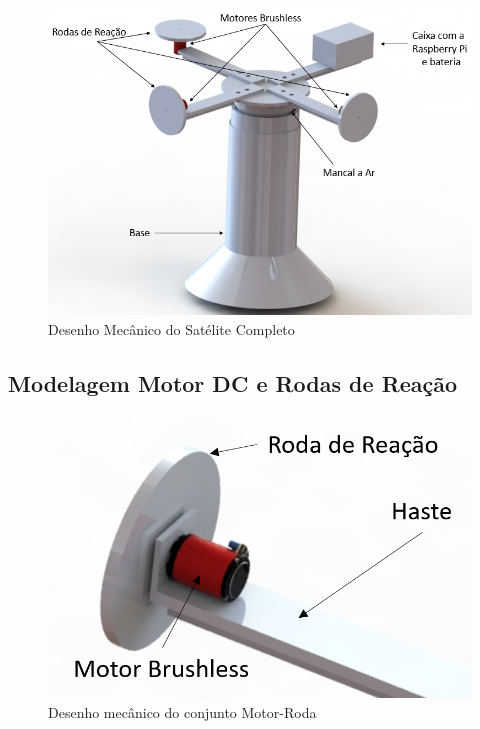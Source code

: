 \begin{figure}[H]
  \caption{Desenho Mecânico do Satélite Completo}
  \begin{center}
      \includegraphics[scale=.75]{img/satelite_completo}
  \end{center}
  \label{fig:satelite_completo}
\end{figure}


\subsection{Modelagem Motor DC e Rodas de Reação}

\begin{figure}[H]
  \caption{Desenho mecânico do conjunto Motor-Roda}
  \begin{center}
      \includegraphics[scale=.45]{img/motor_roda_desenho}
  \end{center}
  \label{fig:motor_roda_desenho}
\end{figure}


